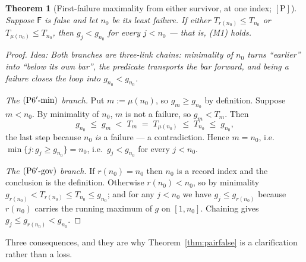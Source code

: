 \documentclass[11pt,a4paper]{article}
\theoremstyle{plain}
\newtheorem{theorem}{Theorem}[section]
\theoremstyle{definition}
\theoremstyle{remark}
\newcommand{\idea}[1]{\emph{Idea: #1}\par\smallskip}
\newcommand{\cP}{{[\mathrm{P}]}}
\newcommand{\Fb}{\mathsf{F}}
\newcommand{\Pgov}{\textup{(P6$'$-gov)}}
\newcommand{\Pmin}{\textup{(P6$'$-min)}}
\begin{document}
\begin{theorem}[First-failure maximality from either survivor, at one index; $\cP$]
\label{thm:ffm}
Suppose $\Fb$ is false and let $n_0$ be its least failure. If \emph{either}
$T_{r(n_0)} \le T_{n_0}$ \emph{or} $T_{\mu(n_0)} \le T_{n_0}$, then $g_j < g_{n_0}$ for every
$j < n_0$ --- that is, \textup{(M1)} holds.
\end{theorem}

\begin{proof}
\idea{Both branches are three-link chains: minimality of $n_0$ turns ``earlier'' into
``below its own bar'', the predicate transports the bar forward, and being a failure closes
the loop into $g_{n_0} < g_{n_0}$.}
\emph{The $\Pmin$ branch.} Put $m := \mu(n_0)$, so $g_m \ge g_{n_0}$ by definition. Suppose
$m < n_0$. By minimality of $n_0$, $m$ is not a failure, so $g_m < T_m$. Then
\[
g_{n_0} \;\le\; g_m \;<\; T_m \;=\; T_{\mu(n_0)} \;\le\; T_{n_0} \;\le\; g_{n_0},
\]
the last step because $n_0$ \emph{is} a failure --- a contradiction. Hence $m = n_0$, i.e.\
$\min\{j : g_j \ge g_{n_0}\} = n_0$, i.e.\ $g_j < g_{n_0}$ for every $j < n_0$.

\emph{The $\Pgov$ branch.} If $r(n_0) = n_0$ then $n_0$ is a record index and the conclusion
is the definition. Otherwise $r(n_0) < n_0$, so by minimality
$g_{r(n_0)} < T_{r(n_0)} \le T_{n_0} \le g_{n_0}$; and for any $j < n_0$ we have
$g_j \le g_{r(n_0)}$ because $r(n_0)$ carries the running maximum of $g$ on $[1,n_0]$.
Chaining gives $g_j \le g_{r(n_0)} < g_{n_0}$.
\end{proof}

Three consequences, and they are why Theorem~\ref{thm:pairfalse} is a clarification rather
than a loss.
\end{document}
